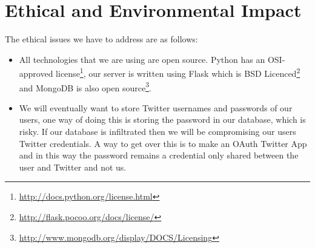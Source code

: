 \documentclass[a4paper,12pt]{article}
\begin{document}
	\section{Ethical and Environmental Impact}	
	
	The ethical issues we have to address are as follows:
	
	\begin{itemize}
	  
	  \item All technologies that we are using are open source. Python has an OSI-approved license\footnote{\url {http://docs.python.org/license.html}}, our server is written using Flask which is BSD Licenced\footnote{\url{http://flask.pocoo.org/docs/license/}} and MongoDB is also open source\footnote{\url{http://www.mongodb.org/display/DOCS/Licensing}}.
	  
	  \item We will eventually want to store Twitter usernames and passwords of our users, one way of doing this is storing the password in our database, which is risky. If our database is infiltrated then we will be compromising our users Twitter credentials. A way to get over this is to make an OAuth Twitter App and in this way the password remains a credential only shared between the user and Twitter and not us. 
	  
  \end{itemize}
  
\end{document}
